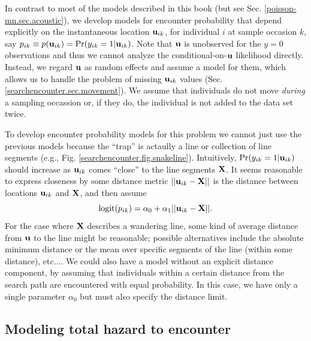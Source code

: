 In contrast to most of the models described in this book (but see
Sec. \ref{poisson-mn.sec.acoustic}), we develop models for encounter
probability that depend explicitly on the instantaneous location ${\bf
  u}_{ik}$, for individual $i$ at sample occasion $k$, say $p_{ik}
\equiv p({\bf u}_{ik}) = \Pr(y_{ik}=1|{\bf u}_{ik})$.  Note that ${\bf
  u}$ is unobserved for the $y=0$ observations and thus we cannot
analyze the conditional-on-${\bf u}$ likelihood directly. Instead, we
regard ${\bf u}$ as random effects and assume a model for them, which
allows us to handle the problem of missing ${\bf u}_{ik}$ values
(Sec. \ref{searchencounter.sec.movement}).  We assume that individuals
do not move {\it during} a sampling occassion or, if they do, the
individual is not added to the data set twice.

To develop encounter probability models for this problem we cannot
just use the previous models because the ``trap'' is actaully a line
or collection of line segments (e.g.,
Fig. \ref{searchencounter.fig.snakeline}).  Intuitively,
$\Pr(y_{ik}=1|{\bf u}_{ik})$ should increase as ${\bf u}_{ik}$ comes
``close'' to the line segments ${\bf X}$. It seems reasonable to
express closeness by some distance metric $||{\bf u}_{ik} - {\bf X}
||$ is the distance between locations ${\bf u}_{ik}$ and ${\bf X}$,
and then assume
\[
\mbox{logit}(p_{ik}) = \alpha_{0} + \alpha_{1} ||{\bf u}_{ik} - {\bf X}||.
\]
For the case where ${\bf X}$ describes a wandering line, some kind of
average distance from ${\bf u}$ to the line might be reasonable;
possible alternatives include the absolute minimum distance or the
mean over specific segments of the line (within some distance),
etc$\dots$.  We could also have a model without an explicit distance
component, by assuming that individuals within a certain distance from
the search path are encountered with equal probability. In this case,
we have only a single parameter $\alpha_{0}$ but must also specify the
distance limit.


\subsection{Modeling total hazard to encounter}

